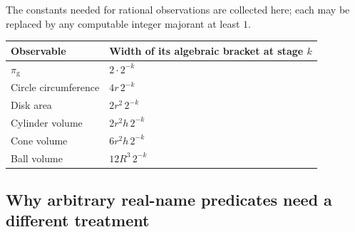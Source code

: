 The constants needed for rational observations are collected here;
each may be replaced by any computable integer majorant at least $1$.
\begin{center}
\begin{tabular}{ll}
\toprule
Observable & Width of its algebraic bracket at stage $k$\\
\midrule
$\pi_{\mathrm g}$ & $2\cdot2^{-k}$\\
Circle circumference & $4r\,2^{-k}$\\
Disk area & $2r^2\,2^{-k}$\\
Cylinder volume & $2r^2h\,2^{-k}$\\
Cone volume & $6r^2h\,2^{-k}$\\
Ball volume & $12R^3\,2^{-k}$\\
\bottomrule
\end{tabular}
\end{center}

\subsection{Why arbitrary real-name predicates need a different treatment}

